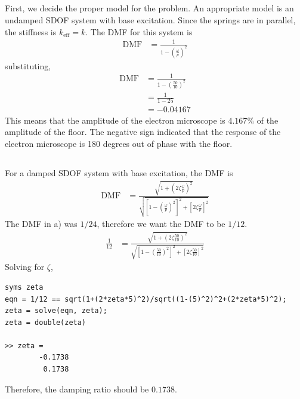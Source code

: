 \subsection{}
First, we decide the proper model for the problem. An appropriate model is an undamped SDOF system with base excitation. Since the springs are in parallel, the stiffness is $k_{\text{eff}} = k$. The DMF for this system is 
\begin{align*}
    \text{DMF} &= \frac{1}{1 - \left(\frac{\omega}{p}\right)^2}
\end{align*}
substituting,
\begin{align*}
    \text{DMF} &= \frac{1}{1 - \left(\frac{50}{10}\right)^2} \\
    &= \frac{1}{1 - 25} \\
    &= -0.04167
\end{align*}
This means that the amplitude of the electron microscope is $\boxed{4.167\%}$ of the amplitude of the floor. The negative sign indicated that the response of the electron microscope is 180 degrees out of phase with the floor.

\subsection{}
For a damped SDOF system with base excitation, the DMF is
\begin{align*}
    \text{DMF} &= \frac{\sqrt{1+\left(2\zeta\frac{\omega}{p}\right)^{2}}}{\sqrt{\left[1-\left(\frac{\omega}{p}\right)^{2}\right]^{2}+\left[2\zeta\frac{\omega}{p}\right]^{2}}}
\end{align*}
The DMF in a) was $1/24$, therefore we want the DMF to be $1/12$. 
\begin{align*}
    \frac{1}{12} &= \frac{\sqrt{1+\left(2\zeta\frac{50}{10}\right)^{2}}}{\sqrt{\left[1-\left(\frac{50}{10}\right)^{2}\right]^{2}+\left[2\zeta\frac{50}{10}\right]^{2}}} 
\end{align*}
Solving for $\zeta$,
\begin{verbatim}
syms zeta
eqn = 1/12 == sqrt(1+(2*zeta*5)^2)/sqrt((1-(5)^2)^2+(2*zeta*5)^2);
zeta = solve(eqn, zeta);
zeta = double(zeta)

>> zeta =
        -0.1738
         0.1738
\end{verbatim}
Therefore, the damping ratio should be $\boxed{0.1738}$.

